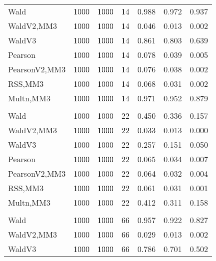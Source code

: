 \documentclass[
]{article}
\begin{document}
\begin{table}[H]
{\begin{tabular}[t]{lrrrrrr}
\hspace{1em}Wald & 1000 & 1000 & 14 & 0.988 & 0.972 & 0.937\\
\hspace{1em}WaldV2,MM3 & 1000 & 1000 & 14 & 0.046 & 0.013 & 0.002\\
\hspace{1em}WaldV3 & 1000 & 1000 & 14 & 0.861 & 0.803 & 0.639\\
\hspace{1em}Pearson & 1000 & 1000 & 14 & 0.078 & 0.039 & 0.005\\
\hspace{1em}PearsonV2,MM3 & 1000 & 1000 & 14 & 0.076 & 0.038 & 0.002\\
\hspace{1em}RSS,MM3 & 1000 & 1000 & 14 & 0.068 & 0.031 & 0.002\\
\hspace{1em}Multn,MM3 & 1000 & 1000 & 14 & 0.971 & 0.952 & 0.879\\
\addlinespace[0.3em]
\multicolumn{7}{l}{\textbf{2F 10V}}\\
\hspace{1em}Wald & 1000 & 1000 & 22 & 0.450 & 0.336 & 0.157\\
\hspace{1em}WaldV2,MM3 & 1000 & 1000 & 22 & 0.033 & 0.013 & 0.000\\
\hspace{1em}WaldV3 & 1000 & 1000 & 22 & 0.257 & 0.151 & 0.050\\
\hspace{1em}Pearson & 1000 & 1000 & 22 & 0.065 & 0.034 & 0.007\\
\hspace{1em}PearsonV2,MM3 & 1000 & 1000 & 22 & 0.064 & 0.032 & 0.004\\
\hspace{1em}RSS,MM3 & 1000 & 1000 & 22 & 0.061 & 0.031 & 0.001\\
\hspace{1em}Multn,MM3 & 1000 & 1000 & 22 & 0.412 & 0.311 & 0.158\\
\addlinespace[0.3em]
\multicolumn{7}{l}{\textbf{3F 15V}}\\
\hspace{1em}Wald & 1000 & 1000 & 66 & 0.957 & 0.922 & 0.827\\
\hspace{1em}WaldV2,MM3 & 1000 & 1000 & 66 & 0.029 & 0.013 & 0.002\\
\hspace{1em}WaldV3 & 1000 & 1000 & 66 & 0.786 & 0.701 & 0.502\\

\end{tabular}}
\end{table}
\end{document}
